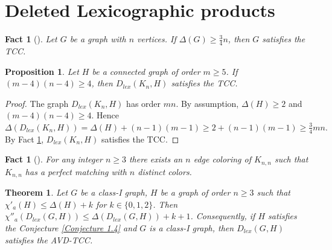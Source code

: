 \documentclass[12pt,reqno,a4paper]{amsart}
\theoremstyle{definition}
\theoremstyle{plain}
\newtheorem{thm}[defn]{Theorem}
\newtheorem{prop}[defn]{Proposition}
\newtheorem{fact}[defn]{Fact}
\begin{document}
\section{Deleted Lexicographic products}

\begin{fact}[\cite{Yap1996}]\label{Fact 3.1}
Let $G$ be a graph with $n$ vertices. If $\Delta(G) \geq \frac34 n$, then $G$ satisfies the TCC.
\end{fact}

\begin{prop}\label{Proposition 3.2}
Let $H$ be a connected graph of order $m\ge 5$. If
$(m-4)(n-4)\ge 4$,
then $D_{lex}(K_n,H)$ satisfies the TCC.
\end{prop}

\begin{proof}
The graph $D_{lex}(K_n,H)$ has order $mn$. 
By assumption, $\Delta(H)\ge2$ and $(m-4)(n-4)\ge4$. Hence
$
\Delta(D_{lex}(K_n,H))
=
\Delta(H)+(n-1)(m-1)\ge
2+(n-1)(m-1)\ge\frac34 mn.
$
By Fact \ref{Fact 3.1},
$
D_{lex}(K_n,H)
$
satisfies the TCC.
\end{proof}

\begin{fact}[\cite{Yap1996}]\label{Fact 3.3}
For any integer $n \geq 3$ there exists an $n$ edge coloring of $K_{n,n}$ such that
$K_{n,n}$ has a perfect matching with $n$ distinct colors.
\end{fact} 

\begin{thm}\label{Theorem 3.4}
    Let $G$ be a class-I graph, $H$ be a graph of order $n\geq 3$ such that $\chi'_{a}(H)\leq \Delta(H)+k$ for $k\in \{0,1,2\}$. Then $\chi''_{a}(D_{lex}(G, H))\leq \Delta(D_{lex}(G, H)) +k+1$.
    Consequently, if $H$ satisfies the
    Conjecture \ref{Conjecture 1.4} and $G$ is a class-I graph, then 
    $D_{lex}(G, H)$ satisfies the AVD-TCC.
\end{thm}
\end{document}
